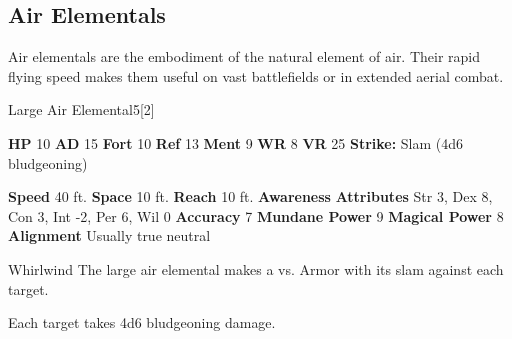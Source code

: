       
    \subsection{Air Elementals}
      
      Air elementals are the embodiment of the natural element of air.
      Their rapid flying speed makes them useful on vast battlefields or in extended aerial combat.
    

      
  \begin{monsubsection}{Large Air Elemental}{5}[2]
    \vspace{-1em}\vspace{-1em}
    \vspace{0em}

    
    

    \begin{spellcontent}
      \begin{spelltargetinginfo}
        \pari \textbf{HP} 10 \monsep
          \textbf{AD} 15 \monsep
          \textbf{Fort} 10 \monsep
          \textbf{Ref} 13 \monsep
          \textbf{Ment} 9
        \pari \textbf{WR} 8 \monsep
        \textbf{VR} 25
        \pari \textbf{Strike:}
            Slam  (4d6 bludgeoning)
      \end{spelltargetinginfo}
    \end{spellcontent}
    \begin{monsterfooter}
      \pari \textbf{Speed} 40 ft. \monsep
        \textbf{Space} 10 ft. \monsep
        \textbf{Reach} 10 ft.
      \pari \textbf{Awareness} 
      \pari \textbf{Attributes}
        Str 3, Dex 8,
        Con 3, Int -2,
        Per 6, Wil 0
      \pari \textbf{Accuracy} 7 \monsep
        \textbf{Mundane Power} 9 \monsep
      \textbf{Magical Power} 8
      \pari \textbf{Alignment} Usually true neutral
    \end{monsterfooter}
  \end{monsubsection}
  \begin{freeability}{Whirlwind}
       The large air elemental makes a 
         vs. Armor
        with its slam against each target.
    
    \hit Each target takes 4d6 bludgeoning damage.
    \end{freeability}
  

